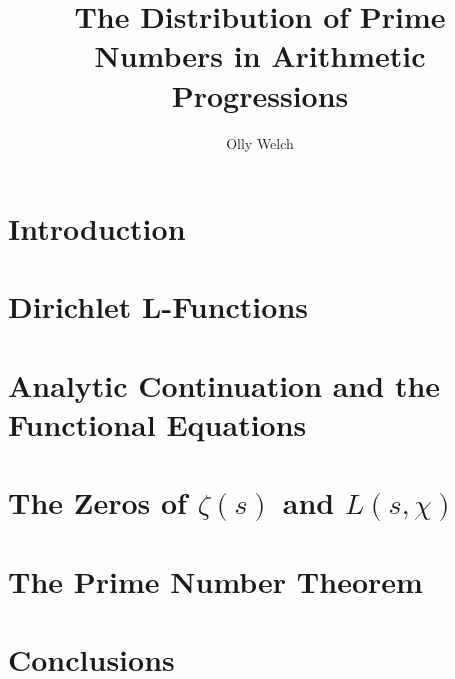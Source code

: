 \documentclass[11pt]{report} %
\title{The Distribution of Prime Numbers in Arithmetic Progressions}
\author{Olly Welch}
\numberwithin{equation}{chapter}
\begin{document}
\maketitle

\DeclarePairedDelimiter\abs{\lvert}{\rvert}
\DeclarePairedDelimiter\norm{\lVert}{\rVert}
\makeatletter
\let\oldabs\abs
\def\abs{\@ifstar{\oldabs}{\oldabs*}}
\let\oldnorm\norm
\def\norm{\@ifstar{\oldnorm}{\oldnorm*}}
\makeatother

\newtheorem{theorem}{Theorem}[chapter]
\newtheorem{corollary}[theorem]{Corollary}
\newtheorem{lemma}[theorem]{Lemma}
\newtheorem{proposition}[theorem]{Proposition}
\theoremstyle{definition}
\newtheorem{definition}[theorem]{Definition}
\theoremstyle{remark}
\newtheorem*{remark}{Remark}

\tableofcontents

\chapter{Introduction}

\chapter{Dirichlet L-Functions}




\chapter{Analytic Continuation and the Functional Equations}




\chapter{The Zeros of $\zeta(s)$ and $L(s, \chi)$}







\chapter{The Prime Number Theorem}




\chapter{Conclusions}
\appendix
\appendixpage
\addappheadtotoc
\end{document}

